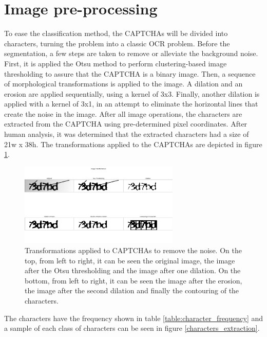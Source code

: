 \documentclass[journal]{IEEEtran}
\begin{document}
\section{Image pre-processing}

To ease the classification method, the CAPTCHAs will be divided into characters, turning the problem into a classic OCR problem. Before the segmentation, a few steps are taken to remove or alleviate the background noise. First, it is applied the Otsu method to perform clustering-based image thresholding to assure that the CAPTCHA is a binary image. Then, a sequence of morphological transformations is applied to the image. A dilation and an erosion are applied sequentially, using a kernel of 3x3. Finally, another dilation is applied with a kernel of 3x1, in an attempt to eliminate the horizontal lines that create the noise in the image. After all image operations, the characters are extracted from the CAPTCHA using pre-determined pixel coordinates. After human analysis, it was determined that the extracted characters had a size of 21w x 38h. The transformations applied to the CAPTCHAs are depicted in figure \ref{image_transformations}.

\begin{figure}[!t]
\centering
\includegraphics[width=3in]{images/image_Transformations}
\caption{Transformations applied to CAPTCHAs to remove the noise. On the top, from left to right, it can be seen the original image, the image after the Otsu thresholding and the image after one dilation. On the bottom, from left to right, it can be seen the image after the erosion, the image after the second dilation and finally the contouring of the characters.}
\label{image_transformations}
\end{figure}

The characters have the frequency shown in table \ref{table:character_frequency} and a sample of each class of characters can be seen in figure \ref{characters_extraction}.
\end{document}
